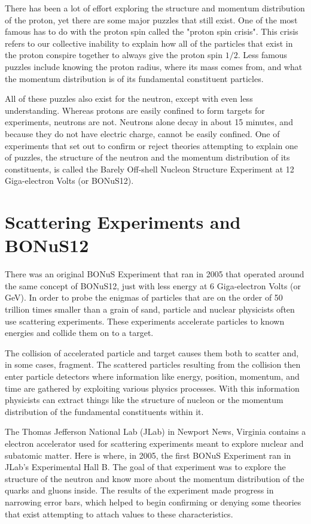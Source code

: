 There has been a lot of effort exploring the structure and momentum distribution of the proton, yet there are some major puzzles that still exist. One of the most famous has to do with the proton spin called the "proton spin crisis". This crisis refers to our collective inability to explain how all of the particles that exist in the proton conspire together to always give the proton spin $1/2$. Less famous puzzles include knowing the proton radius, where its mass comes from, and what the momentum distribution is of its fundamental constituent particles.

All of these puzzles also exist for the neutron, except with even less understanding. Whereas protons are easily confined to form targets for experiments, neutrons are not. Neutrons alone decay in about 15 minutes, and because they do not have electric charge, cannot be easily confined. One of experiments that set out to confirm or reject theories attempting to explain one of puzzles, the structure of the neutron and the momentum distribution of its constituents, is called the Barely Off-shell Nucleon Structure Experiment at 12 Giga-electron Volts (or BONuS12).
 
 \section{Scattering Experiments and BONuS12}
 There was an original BONuS Experiment that ran in 2005 that operated around the same concept of BONuS12, just with less energy at 6 Giga-electron Volts (or GeV). In order to probe the enigmas of particles that are on the order of 50 trillion times smaller than a grain of sand, particle and nuclear physicists often use scattering experiments. These experiments accelerate particles to known energies and collide them on to a target.
 
 The collision of accelerated particle and target causes them both to scatter and, in some cases, fragment. The scattered particles resulting from the collision then enter particle detectors where information like energy, position, momentum, and time are gathered by exploiting various physics processes. With this information physicists can extract things like the structure of nucleon or the momentum distribution of the fundamental constituents within it.
 
 The Thomas Jefferson National Lab (JLab) in Newport News, Virginia contains a electron accelerator used for scattering experiments meant to explore nuclear and subatomic matter. Here is where, in 2005, the first BONuS Experiment ran in JLab's Experimental Hall B. The goal of that experiment was to explore the structure of the neutron and know more about the momentum distribution of the quarks and gluons inside. The results of the experiment made progress in narrowing error bars, which helped to begin confirming or denying some theories that exist attempting to attach values to these characteristics.
 
